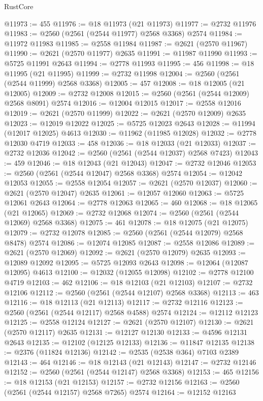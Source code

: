 \begin{lexlean}{RustCore}
\begin{coremodule}
@11973 := 455
@11976 := @18 @11973 (@21 @11973)
@11977 := @2732 @11976
@11983 := @2560 (@2561 (@2544 @11977) @2568 @3368) @2574
@11984 := @11972 @11983
@11985 := @2558 @11984
@11987 := @2621 (@2570 @11967)
@11990 := @2621 (@2570 @11977) @2635
@11991 := @11987 @11990
@11993 := @5725 @11991 @2643
@11994 := @2778 @11993
@11995 := 456
@11998 := @18 @11995 (@21 @11995)
@11999 := @2732 @11998
@12004 := @2560 (@2561 (@2544 @11999) @2568 @3368)
@12005 := 457
@12008 := @18 @12005 (@21 @12005)
@12009 := @2732 @12008
@12015 := @2560 (@2561 (@2544 @12009) @2568 @8091) @2574
@12016 := @12004 @12015
@12017 := @2558 @12016
@12019 := @2621 (@2570 @11999)
@12022 := @2621 (@2570 @12009) @2635
@12023 := @12019 @12022
@12025 := @5725 @12023 @2643
@12028 := @11994 (@12017 @12025) @4613
@12030 := @11962 (@11985 @12028)
@12032 := @2778 @12030 @4719
@12033 := 458
@12036 := @18 @12033 (@21 @12033)
@12037 := @2732 @12036
@12042 := @2560 (@2561 (@2544 @12037) @2568 @7423)
@12043 := 459
@12046 := @18 @12043 (@21 @12043)
@12047 := @2732 @12046
@12053 := @2560 (@2561 (@2544 @12047) @2568 @3368) @2574
@12054 := @12042 @12053
@12055 := @2558 @12054
@12057 := @2621 (@2570 @12037)
@12060 := @2621 (@2570 @12047) @2635
@12061 := @12057 @12060
@12063 := @5725 @12061 @2643
@12064 := @2778 @12063
@12065 := 460
@12068 := @18 @12065 (@21 @12065)
@12069 := @2732 @12068
@12074 := @2560 (@2561 (@2544 @12069) @2568 @3368)
@12075 := 461
@12078 := @18 @12075 (@21 @12075)
@12079 := @2732 @12078
@12085 := @2560 (@2561 (@2544 @12079) @2568 @8478) @2574
@12086 := @12074 @12085
@12087 := @2558 @12086
@12089 := @2621 (@2570 @12069)
@12092 := @2621 (@2570 @12079) @2635
@12093 := @12089 @12092
@12095 := @5725 @12093 @2643
@12098 := @12064 (@12087 @12095) @4613
@12100 := @12032 (@12055 @12098)
@12102 := @2778 @12100 @4719
@12103 := 462
@12106 := @18 @12103 (@21 @12103)
@12107 := @2732 @12106
@12112 := @2560 (@2561 (@2544 @12107) @2568 @3368)
@12113 := 463
@12116 := @18 @12113 (@21 @12113)
@12117 := @2732 @12116
@12123 := @2560 (@2561 (@2544 @12117) @2568 @4588) @2574
@12124 := @12112 @12123
@12125 := @2558 @12124
@12127 := @2621 (@2570 @12107)
@12130 := @2621 (@2570 @12117) @2635
@12131 := @12127 @12130
@12133 := @4596 @12131 @2643
@12135 := @12102 (@12125 @12133)
@12136 := @11847 @12135
@12138 := @2376 (@11824 @12136)
@12142 := @2535 (@2538 @364) @7103 @2389
@12143 := 464
@12146 := @18 @12143 (@21 @12143)
@12147 := @2732 @12146
@12152 := @2560 (@2561 (@2544 @12147) @2568 @3368)
@12153 := 465
@12156 := @18 @12153 (@21 @12153)
@12157 := @2732 @12156
@12163 := @2560 (@2561 (@2544 @12157) @2568 @7265) @2574
@12164 := @12152 @12163

\end{coremodule}
\end{lexlean}
